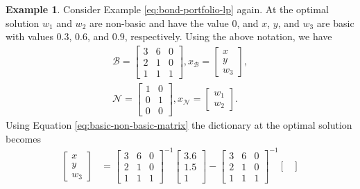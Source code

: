 \documentclass[
]{book}
\theoremstyle{definition}
\theoremstyle{definition}
\newtheorem{example}{Example}[chapter]
\theoremstyle{definition}
\theoremstyle{definition}
\theoremstyle{remark}
\begin{document}
\begin{example}
\protect\hypertarget{exm:basic-non-basic-matrix}{}\label{exm:basic-non-basic-matrix}Consider Example \eqref{eq:bond-portfolio-lp} again. At the optimal solution \(w_1\) and \(w_2\) are non-basic and have the value 0, and \(x\), \(y\), and \(w_3\) are basic with values \(0.3\), \(0.6\), and \(0.9\), respectively. Using the above notation, we have
\begin{align*}
  \mathcal{B} = 
    \begin{bmatrix}
    3 & 6 & 0 \\
    2 & 1 & 0 \\
    1 & 1 & 1
    \end{bmatrix}, 
  x_{\mathcal{B}} 
    = \begin{bmatrix} x \\ y \\ w_3 \end{bmatrix}, \\
  \mathcal{N} = 
    \begin{bmatrix}
    1 & 0 \\
    0 & 1 \\
    0 & 0
    \end{bmatrix}, 
  x_{\mathcal{N}}
    = \begin{bmatrix} w_1 \\ w_2 \end{bmatrix}.
\end{align*}
Using Equation \eqref{eq:basic-non-basic-matrix} the dictionary at the optimal solution becomes
\begin{align*}
  \begin{bmatrix} x \\ y \\ w_3 \end{bmatrix} 
   &= \begin{bmatrix}
    3 & 6 & 0 \\
    2 & 1 & 0 \\
    1 & 1 & 1
    \end{bmatrix}^{-1} 
    \begin{bmatrix}
    3.6 \\ 1.5 \\ 1 
    \end{bmatrix} - 
    \begin{bmatrix}
    3 & 6 & 0 \\
    2 & 1 & 0 \\
    1 & 1 & 1
    \end{bmatrix}^{-1} \begin{bmatrix}

\end{bmatrix}
\end{align*}
\end{example}
\end{document}
